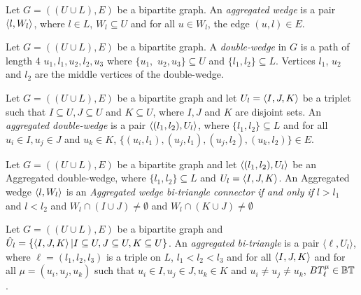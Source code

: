 \begin{definition}\label{def:awg}
Let $G=((U\cup L),E)$ be a bipartite graph. An  \textit{aggregated wedge} is a pair $\left\langle l, W_l \right\rangle$, where $l \in L$, $W_l \subseteq U$ and for all $u\in W_l$, the edge  $(u,l)\in E$. 
\end{definition}

\begin{definition}
Let $G=((U\cup L),E)$ be a bipartite graph. A \textit{double-wedge} in $G$ is a path of length 4 $u_1,l_1,u_2,l_2,u_3$ where  $\{u_1,$ $u_2,u_3\}\subseteq U$ and $\{l_1,l_2\}\subseteq L$. Vertices $l_1$, $u_2$ and $l_2$ are the middle vertices of the double-wedge. 
\end{definition}
  
\begin{definition}\label{def:adwg}
Let $G=((U\cup L),E)$ be a bipartite graph and let $U_l = \left\langle I, J, K\right\rangle$ be a triplet such that $I \subseteq U, J \subseteq U$ and $K \subseteq U$, where $I, J$ and $K$ are disjoint sets. 
An \textit{aggregated double-wedge}  is a pair  $\left\langle (l_1, l_2), U_l \right\rangle$, where $\{l_1,l_2\}\subseteq L$ and  for all $u_i \in I, u_j \in J$ and $u_k \in K$, $\{(u_i, l_1), (u_j, l_1), (u_j, l_2), (u_k, l_2)\} \in E$.
\end{definition}

\begin{definition}\label{def:awgc}
Let $G=((U\cup L),E)$ be a bipartite graph and let $\left\langle (l_1, l_2), U_l \right\rangle$ be an Aggregated double-wedge, where $\{l_1,l_2\}\subseteq L$ and $U_l = \left\langle I, J, K\right\rangle$.
An Aggregated wedge $\left\langle l, W_l \right\rangle$ is an \textit{Aggregated wedge bi-triangle connector} \emph{if and only if} $l > l_1$ and $l < l_2$ and $W_l \cap (I \cup J) \neq \emptyset$ and $W_l \cap (K \cup J) \neq \emptyset$
\end{definition}
      
\begin{definition}\label{def:abt}
Let $G=((U\cup L),E)$ be a bipartite graph and  $\hat{U}_l=\{\left\langle I, J, K\right\rangle | I \subseteq U, J \subseteq U, K \subseteq U\}$. An \textit{aggregated bi-triangle}  is a pair  $\langle \ell, \hat{U}_l\rangle$, 
where $\ell=(l_1, l_2, l_3)$ is a triple on $L$, $l_1 < l_2 < l_3$ and for all $\left\langle I, J, K\right\rangle$ and for all $\mu=(u_i, u_j, u_k)$ such that $u_i \in I, u_j \in J, u_k \in K$ and $u_i \neq u_j \neq u_k$, $BT_{\ell}^{\mu}\in \mathbb{BT}$.
\end{definition}

